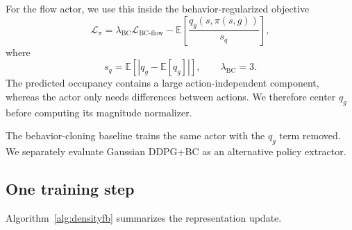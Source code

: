 \documentclass{article}
\newcommand{\E}{\mathbb{E}}
\begin{document}
For the flow actor, we use this inside the behavior-regularized objective
\begin{equation}
\label{eq:actor}
\mathcal L_\pi
=
\lambda_{\mathrm{BC}}
\mathcal L_{\mathrm{BC\text{-}flow}}
-
\E\left[
    \frac{
        q_g(s,\pi(s,g))
    }{
        s_q
    }
\right],
\end{equation}
where
\begin{equation}
s_q
=
\E\left[
    \left|
        q_g-\E[q_g]
    \right|
\right],
\qquad
\lambda_{\mathrm{BC}}=3.
\end{equation}
The predicted occupancy contains a large action-independent component, whereas the actor only needs differences between actions.
We therefore center $q_g$ before computing its magnitude normalizer.

The behavior-cloning baseline trains the same actor with the $q_g$ term removed.
We separately evaluate Gaussian DDPG+BC as an alternative policy extractor.

\subsection{One training step}

Algorithm~\ref{alg:densityfb} summarizes the representation update.
\end{document}
